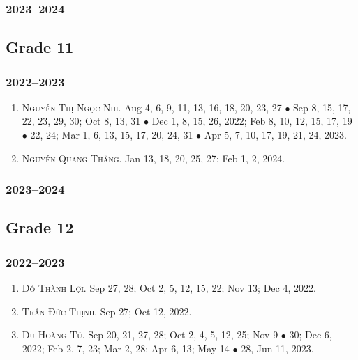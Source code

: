 \documentclass{article}
\begin{document}
\subsubsection{2023--2024}


\subsection{Grade 11}

\subsubsection{2022--2023}

\begin{enumerate}
	\item \textsc{Nguyễn Thị Ngọc Nhi.} {\sf[In]} Aug 4, 6, 9, 11, 13, 16, 18, 20, 23, 27 $\bullet$ Sep 8, 15, 17, 22, 23, 29, 30; Oct 8, 13, 31 $\bullet$ Dec 1, 8,  15, 26, 2022; Feb 8, 10, 12, 15, 17, 19 $\bullet$ 22, 24; Mar 1, 6, 13, 15, 17, 20, 24, 31 $\bullet$ Apr 5, 7, 10, 17, 19, 21, 24, 2023. {\sf[Out]}
	\item \textsc{Nguyễn Quang Thắng.} {\sf[In]} Jan 13, 18, 20, 25, 27; Feb 1, 2, 2024.
\end{enumerate}

\subsubsection{2023--2024}


\subsection{Grade 12}

\subsubsection{2022--2023}

\begin{enumerate}
	\item \textsc{Đỗ Thành Lợi.} {\sf[In]} Sep 27, 28; Oct 2, 5, 12, 15, 22; Nov 13; Dec 4, 2022. {\sf[Out]}
	\item \textsc{Trần Đức Thịnh.} {\sf[In]} Sep 27; Oct 12, 2022. {\sf[Out]}
	\item \textsc{Du Hoàng Tú.} {\sf[In]} Sep 20, 21, 27, 28; Oct 2, 4, 5, 12, 25; Nov 9 $\bullet$ 30; Dec 6, 2022; Feb 2, 7, 23; Mar 2, 28; Apr 6, 13; May 14 $\bullet$ 28, Jun 11, 2023. {\sf[Out]}
\end{enumerate}
\end{document}
